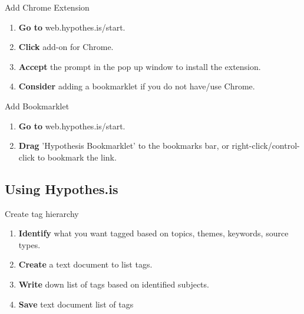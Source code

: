 \documentclass[10pt,a4paper]{article}
\begin{document}
\begin{textbox}{Add Chrome Extension}
 

  

\begin{enumerate}
\item \textbf{Go to} web.hypothes.is/start. 
\item \textbf{Click} add-on for Chrome.
\item \textbf{Accept} the prompt in the pop up window to install the extension. 
\item \textbf{Consider} adding a bookmarklet if you do not have/use Chrome.
\end{enumerate}

\end{textbox}

\begin{textbox}{Add Bookmarklet}
 

  

\begin{enumerate}
\item \textbf{Go to} web.hypothes.is/start. 
\item \textbf{Drag} 'Hypothesis Bookmarklet' to the bookmarks bar, or right-click/control-click to bookmark the link.
\end{enumerate}

\end{textbox}

\subsection{Using Hypothes.is}

\begin{textbox}{Create tag hierarchy}
 

  

\begin{enumerate}
\item \textbf{Identify} what you want tagged based on topics, themes, keywords, source types. 
\item \textbf{Create} a text document to list tags.
\item \textbf{Write} down list of tags based on identified subjects.
\item \textbf{Save} text document list of tags
\end{enumerate}

\end{textbox}
\end{document}
